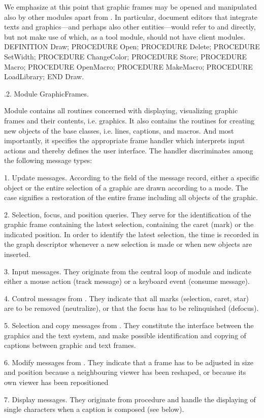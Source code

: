 We emphasize at this point that graphic frames may be opened and manipulated also by other modules apart from . In particular, document editors that integrate texts and graphics---and perhaps also other entities---would refer to  and  directly, but not make use of  which, as a tool module, should not have client modules.
\begintt
DEFINITION Draw; PROCEDURE Open; PROCEDURE Delete; PROCEDURE SetWidth; PROCEDURE ChangeColor; PROCEDURE Store; PROCEDURE Macro;
PROCEDURE OpenMacro; PROCEDURE MakeMacro; PROCEDURE LoadLibrary;
END Draw.
\endtt

.2. Module GraphicFrames.

Module  contains all routines concerned with displaying, visualizing graphic frames and their contents, i.e. graphics. It also contains the routines for creating new objects of the base classes, i.e. lines, captions, and macros. And most importantly, it specifies the appropriate frame handler which interprets input actions and thereby defines the user interface. The handler discriminates among the following message types:

\item{1.} Update messages. According to the  field of the message record, either a specific object or the entire selection of a graphic are drawn according to a mode. The case  signifies a restoration of the entire frame including all objects of the graphic.
\item{2.} Selection, focus, and position queries. They serve for the identification of the graphic frame containing the latest selection, containing the caret (mark) or the indicated position. In order to identify the latest selection, the time is recorded in the graph descriptor whenever a new selection is made or when new objects are inserted.
\item{3.} Input messages. They originate from the central loop of module  and indicate either a mouse action (track message) or a keyboard event (consume message).
\item{4.} Control messages from . They indicate that all marks (selection, caret, star) are to be removed (neutralize), or that the focus has to be relinquished (defocus).
\item{5.} Selection and copy messages from . They constitute the interface between the graphics and the text system, and make possible identification and copying of captions between graphic and text frames.
\item{6.} Modify messages from . They indicate that a frame has to be adjusted in size and position because a neighbouring viewer has been reshaped, or because its own viewer has been repositioned
\item{7.} Display messages. They originate from procedure  and handle the displaying of single characters when a caption is composed (see below).

